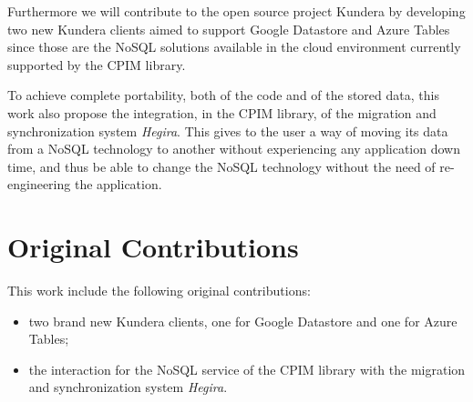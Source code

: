 \noindent Furthermore we will contribute to the open source project Kundera by developing two new Kundera clients aimed to support Google Datastore and Azure Tables since those are the NoSQL solutions available in the cloud environment currently supported by the CPIM library.

\noindent To achieve complete portability, both of the code and of the stored data, this work also propose the integration, in the CPIM library, of the migration and synchronization system \textit{Hegira}. This gives to the user a way of moving its data from a NoSQL technology to another without experiencing any application down time, and thus be able to change the NoSQL technology without the need of re-engineering the application.
 
\section*{Original Contributions}
This work include the following original contributions:
\begin{itemize}
\item two brand new Kundera clients, one for Google Datastore and one for Azure Tables;
\item the interaction for the NoSQL service of the CPIM library with the migration and synchronization system \textit{Hegira}.
\end{itemize}


